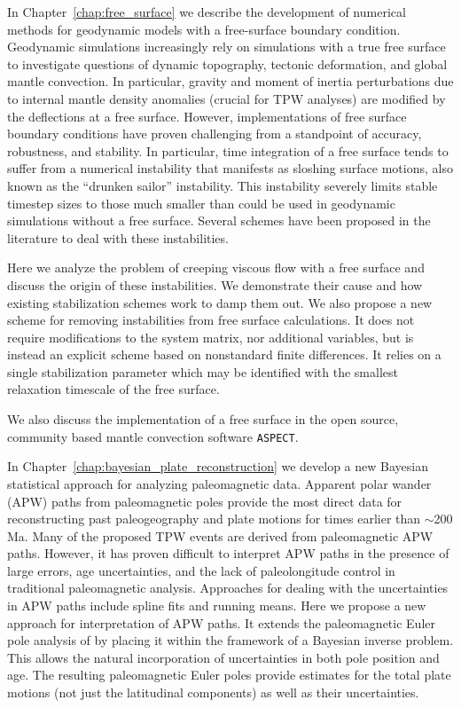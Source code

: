 In Chapter~\ref{chap:free_surface} we describe the development of numerical methods
for geodynamic models with a free-surface boundary condition.
Geodynamic simulations increasingly rely on simulations with a true free surface to 
investigate questions of dynamic topography, tectonic deformation, and
global mantle convection. In particular, gravity and moment of inertia perturbations
due to internal mantle density anomalies (crucial for TPW analyses) are modified by the deflections at a free surface.
However, implementations of free surface boundary conditions 
have proven challenging from a standpoint of accuracy, robustness, and stability.
In particular, time integration of a free surface tends to suffer from a numerical instability
that manifests as sloshing surface motions, also known as the ``drunken sailor'' instability.
This instability severely limits stable timestep sizes to those much smaller than could be used
in geodynamic simulations without a free surface. 
Several schemes have been proposed in the literature to deal with these instabilities.

Here we analyze the problem of creeping viscous flow with a free surface and discuss the 
origin of these instabilities. We demonstrate their cause and how existing stabilization 
schemes work to damp them out.
We also propose a new scheme for removing instabilities from free surface calculations. 
It does not require modifications to the system matrix, nor additional variables, but is instead
an explicit scheme based on nonstandard finite differences.  It relies on a single 
stabilization parameter which may be identified with the smallest relaxation timescale of the
free surface.

We also discuss the implementation of a free surface in the open source, community based
mantle convection software \texttt{ASPECT}.

In Chapter~\ref{chap:bayesian_plate_reconstruction} we develop a new Bayesian statistical approach
for analyzing paleomagnetic data.
Apparent polar wander (APW) paths from paleomagnetic poles provide the most direct data
for reconstructing past paleogeography and plate motions for times earlier than $\sim$200 Ma. 
Many of the proposed TPW events are derived from paleomagnetic APW paths.
However, it has proven difficult to interpret APW paths in the presence of large errors,
age uncertainties, and the lack of paleolongitude control in traditional paleomagnetic analysis.
Approaches for dealing with the uncertainties in APW paths include spline fits and running means.
Here we propose a new approach for interpretation of APW paths.
It extends the paleomagnetic Euler pole analysis of \citet{gordon1984paleomagnetic}
by placing it within the framework of a Bayesian inverse problem.
This allows the natural incorporation of uncertainties in both pole position and age.
The resulting paleomagnetic Euler poles provide estimates for the total
plate motions (not just the latitudinal components) as well as their uncertainties.


